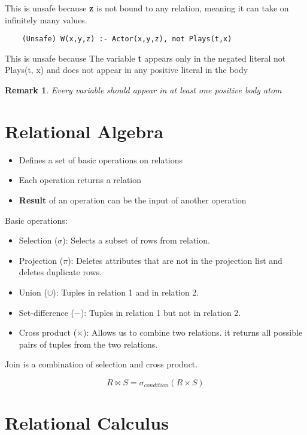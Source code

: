 \documentclass[12pt,a4paper]{article}
\newtheorem*{rem}{Remark}
\newcommand{\Remark}[1]{
  \begin{rem}
    \color{cyan}
    #1
  \end{rem}
}
\begin{document}
This is unsafe because \textbf{z} is not bound to any relation, meaning it can take on infinitely many values.

\begin{verbatim}
    (Unsafe) W(x,y,z) :- Actor(x,y,z), not Plays(t,x)
\end{verbatim}

This is unsafe because The variable \textbf{t} appears only in the negated literal not Plays(t, x) and does not appear in any positive literal in the body

\Remark{Every variable should appear in at least one positive body atom}

\section*{Relational Algebra}

\begin{itemize}
    \item Defines a set of basic operations on relations
    \item Each operation returns a relation
    \item \textbf{Result} of an operation can be the input of another operation
\end{itemize}

Basic operations:

\begin{itemize}
    \item Selection ($\sigma$): Selects a subset of rows from relation.
    \item Projection ($\pi$): Deletes attributes that are not in the projection list and deletes duplicate rows.
    \item Union ($\cup$): Tuples in relation 1 and in relation 2.
    \item Set-difference ($-$): Tuples in relation 1 but not in relation 2.
    \item Cross product ($\times$): Allows us to combine two relations. it returns all possible pairs of tuples from the two relations.
\end{itemize}

Join is a combination of selection and cross product.

\[ R \bowtie S = \sigma_{condition} (R \times S) \]

\section*{Relational Calculus}
\end{document}
